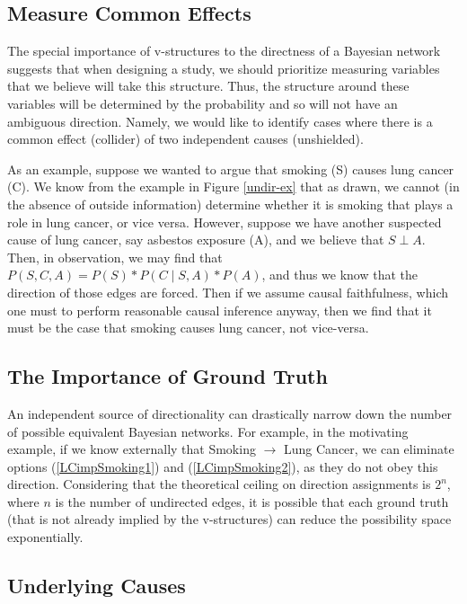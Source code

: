 \documentclass{article}
\begin{document}
	\subsection{Measure Common Effects}
	The special importance of v-structures to the directness of a Bayesian network suggests that when designing a study, we should prioritize measuring variables that we believe will take this structure.
	Thus, the structure around these variables will be determined by the probability and so will not have an ambiguous direction.
	Namely, we would like to identify cases where there is a common effect (collider) of two independent causes (unshielded).
	
	As an example, suppose we wanted to argue that smoking (S) causes lung cancer (C).
	We know from the example in Figure \ref{undir-ex} that as drawn, we cannot (in the absence of outside information) determine whether it is smoking that plays a role in lung cancer, or vice versa.
	However, suppose we have another suspected cause of lung cancer, say asbestos exposure (A), and we believe that $S \perp A$.
	Then, in observation, we may find that $P(S, C, A) = P(S)*P(C \mid S, A)*P(A)$, and thus we know that the direction of those edges are forced.
	Then if we assume causal faithfulness, which one must to perform reasonable causal inference anyway, then we find that it must be the case that smoking causes lung cancer, not vice-versa.
	
	\subsection{The Importance of Ground Truth}
	An independent source of directionality can drastically narrow down the number of possible equivalent Bayesian networks. For example, in the motivating example, if we know externally that Smoking $\rightarrow$ Lung Cancer, we can eliminate options (\ref{LCimpSmoking1}) and (\ref{LCimpSmoking2}), as they do not obey this direction.
	Considering that the theoretical ceiling on direction assignments is $2^n$, where $n$ is the number of undirected edges, it is possible that each ground truth (that is not already implied by the v-structures) can reduce the possibility space exponentially.
	
	\subsection{Underlying Causes}
	
	
	
	
	\appendix
	
\end{document}
